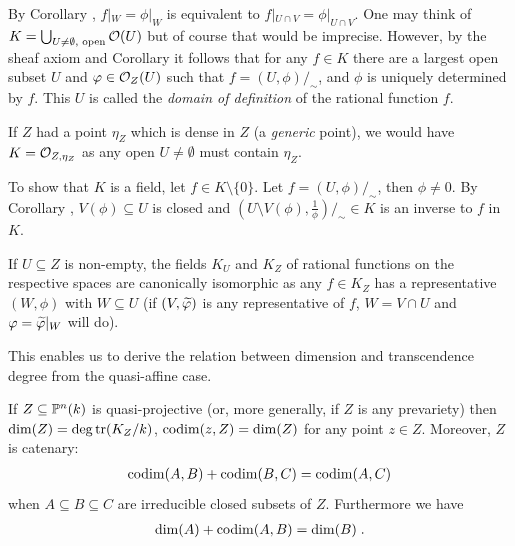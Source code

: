 \documentclass[a4paper,parskip=half,numbers=enddot, DIV=12]{scrreprt}
\begin{document}
\begin{rem*}
    \begin{alphanumerate}
        \item 
            By Corollary , $f|_W = \phi|_W$ is equivalent to $f|_{U\cap V} = \phi|_{U\cap V}$. One may think of $K=\bigcup_{U\neq\emptyset,\text{ open}} \mathcal{O}(U)$ but of course that would be imprecise. However, by the sheaf axiom and Corollary  it follows that for any $f\in K$ there are a largest open subset $U$ and $\varphi \in \mathcal{O}_Z(U)$ such that $f=(U,\phi)/_\sim$, and $\phi$ is uniquely determined by $f$. This $U$ is called the \emph{domain of definition} of the rational function $f$.
        \item 
            If $Z$ had a point $\eta_Z$ which is dense in $Z$ (a \emph{generic} point), we would have $K = \mathcal{O}_{Z,\eta_Z}$ as any open $U\neq \emptyset$ must contain $\eta_Z$.
        \item
            To show that $K$ is a field, let $f\in K\setminus \{0\}$. Let $f=(U,\phi)/_\sim$, then $\phi\neq 0$. By Corollary , $V(\phi)\subseteq U$ is closed and $\left(U\setminus V(\phi), \frac{1}{\phi}\right)/_\sim \in K$ is an inverse to $f$ in $K$.
        \item 
            If $U\subseteq Z$ is non-empty, the fields $K_U$ and $K_Z$ of rational functions on the respective spaces are canonically isomorphic as any $f\in K_Z$ has a representative $(W,\phi)$ with $W\subseteq U$ (if $(V,\snake\phi)$ is any representative of $f$, $W=V\cap U$ and $\phi=\snake \phi|_W$ will do).
    \end{alphanumerate}
\end{rem*}
This enables us to derive the relation between dimension and transcendence degree from the quasi-affine case.
\begin{prop}
    If $Z\subseteq \mathbb{P}^n(k)$ is quasi-projective (or, more generally, if $Z$ is any prevariety) then $\dim(Z) = \deg\operatorname{tr}(K_Z/k)$, $\operatorname{codim}(z,Z) = \dim(Z)$ for any point $z\in Z$. Moreover, $Z$ is catenary:
    \begin{align*}
        \operatorname{codim}(A,B) +\operatorname{codim}(B,C) = \operatorname{codim}(A,C)
    \end{align*}
    when $A\subseteq B\subseteq C$ are irreducible closed subsets of $Z$. Furthermore we have
    \begin{align*}
        \dim(A) +\operatorname{codim}(A,B) = \dim(B)\;.
    \end{align*}
\end{prop}
\end{document}
